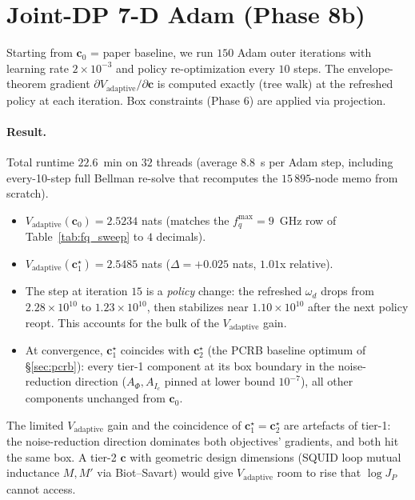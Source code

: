 \documentclass[11pt,a4paper]{article}
\begin{document}
\section{Joint-DP 7-D Adam (Phase 8b)}
\label{sec:joint}

Starting from $\bm c_0$ = paper baseline, we run $150$ Adam outer iterations with learning rate $2\!\times\!10^{-3}$ and policy re-optimization every $10$ steps.  The envelope-theorem gradient $\partial V_{\text{adaptive}}/\partial\bm c$ is computed exactly (tree walk) at the refreshed policy at each iteration.  Box constraints (Phase 6) are applied via projection.

\paragraph{Result.}  Total runtime $22.6$~min on $32$ threads (average $8.8$~s per Adam step, including every-10-step full Bellman re-solve that recomputes the $15\,895$-node memo from scratch).
\begin{itemize}[nosep]
  \item $V_{\text{adaptive}}(\bm c_0) = 2.5234$ nats (matches the $f_q^{\max} = 9$~GHz row of Table~\ref{tab:fq_sweep} to $4$ decimals).
  \item $V_{\text{adaptive}}(\bm c^\star_1) = 2.5485$ nats \hfill ($\Delta = +0.025$ nats, $1.01$x relative).
  \item The step at iteration $15$ is a \emph{policy} change: the refreshed $\omega_d$ drops from $2.28\!\times\!10^{10}$ to $1.23\!\times\!10^{10}$, then stabilizes near $1.10\!\times\!10^{10}$ after the next policy reopt.  This accounts for the bulk of the $V_{\text{adaptive}}$ gain.
  \item At convergence, $\bm c^\star_1$ coincides with $\bm c^\star_2$ (the PCRB baseline optimum of \S\ref{sec:pcrb}): every tier-1 component at its box boundary in the noise-reduction direction ($A_\Phi, A_{I_c}$ pinned at lower bound $10^{-7}$), all other components unchanged from $\bm c_0$.
\end{itemize}
The limited $V_{\text{adaptive}}$ gain and the coincidence of $\bm c^\star_1 = \bm c^\star_2$ are artefacts of tier-1: the noise-reduction direction dominates both objectives' gradients, and both hit the same box.  A tier-2 $\bm c$ with geometric design dimensions (SQUID loop mutual inductance $M, M'$ via Biot--Savart) would give $V_{\text{adaptive}}$ room to rise that $\log J_P$ cannot access.
\end{document}
